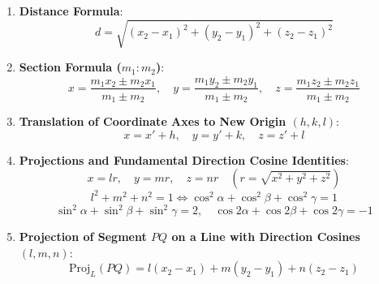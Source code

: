 \begin{theorembox}
\begin{enumerate}
    \item \textbf{Distance Formula}:
    \begin{equation}
        \boxed{d = \sqrt{(x_2 - x_1)^2 + (y_2 - y_1)^2 + (z_2 - z_1)^2}}
    \end{equation}
    \item \textbf{Section Formula ($m_1 : m_2$)}:
    \begin{equation}
        \boxed{x = \frac{m_1 x_2 \pm m_2 x_1}{m_1 \pm m_2}, \quad y = \frac{m_1 y_2 \pm m_2 y_1}{m_1 \pm m_2}, \quad z = \frac{m_1 z_2 \pm m_2 z_1}{m_1 \pm m_2}}
    \end{equation}
    \item \textbf{Translation of Coordinate Axes to New Origin $(h, k, l)$}:
    \begin{equation}
        \boxed{x = x' + h, \quad y = y' + k, \quad z = z' + l}
    \end{equation}
    \item \textbf{Projections and Fundamental Direction Cosine Identities}:
    \begin{equation}
        \boxed{x = lr, \quad y = mr, \quad z = nr \quad (r = \sqrt{x^2+y^2+z^2})}
    \end{equation}
    \begin{equation}
        \boxed{l^2 + m^2 + n^2 = 1 \iff \cos^2\alpha + \cos^2\beta + \cos^2\gamma = 1}
    \end{equation}
    \begin{equation}
        \boxed{\sin^2\alpha + \sin^2\beta + \sin^2\gamma = 2, \quad \cos 2\alpha + \cos 2\beta + \cos 2\gamma = -1}
    \end{equation}
    \item \textbf{Projection of Segment $PQ$ on a Line with Direction Cosines $(l, m, n)$}:
    \begin{equation}
        \boxed{\text{Proj}_L(PQ) = l(x_2 - x_1) + m(y_2 - y_1) + n(z_2 - z_1)}
    \end{equation}
\end{enumerate}
\end{theorembox}

